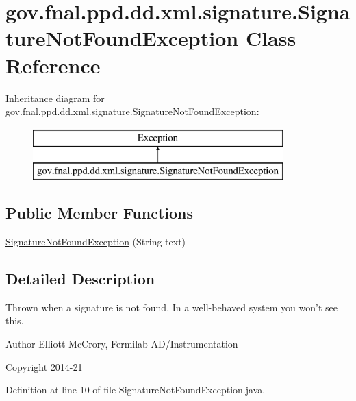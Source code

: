\hypertarget{classgov_1_1fnal_1_1ppd_1_1dd_1_1xml_1_1signature_1_1SignatureNotFoundException}{\section{gov.\-fnal.\-ppd.\-dd.\-xml.\-signature.\-Signature\-Not\-Found\-Exception Class Reference}
\label{classgov_1_1fnal_1_1ppd_1_1dd_1_1xml_1_1signature_1_1SignatureNotFoundException}
}
Inheritance diagram for gov.\-fnal.\-ppd.\-dd.\-xml.\-signature.\-Signature\-Not\-Found\-Exception\-:\begin{figure}[H]
\begin{center}
\leavevmode
\includegraphics[height=2.000000cm]{classgov_1_1fnal_1_1ppd_1_1dd_1_1xml_1_1signature_1_1SignatureNotFoundException}
\end{center}
\end{figure}
\subsection*{Public Member Functions}
\begin{DoxyCompactItemize}
\item 
\hyperlink{classgov_1_1fnal_1_1ppd_1_1dd_1_1xml_1_1signature_1_1SignatureNotFoundException_af80eae7d40d4d237e1f236753ce468e5}{Signature\-Not\-Found\-Exception} (String text)
\end{DoxyCompactItemize}


\subsection{Detailed Description}
Thrown when a signature is not found. In a well-\/behaved system you won't see this.

\begin{DoxyAuthor}{Author}
Elliott Mc\-Crory, Fermilab A\-D/\-Instrumentation 
\end{DoxyAuthor}
\begin{DoxyCopyright}{Copyright}
2014-\/21 
\end{DoxyCopyright}


Definition at line 10 of file Signature\-Not\-Found\-Exception.\-java.



